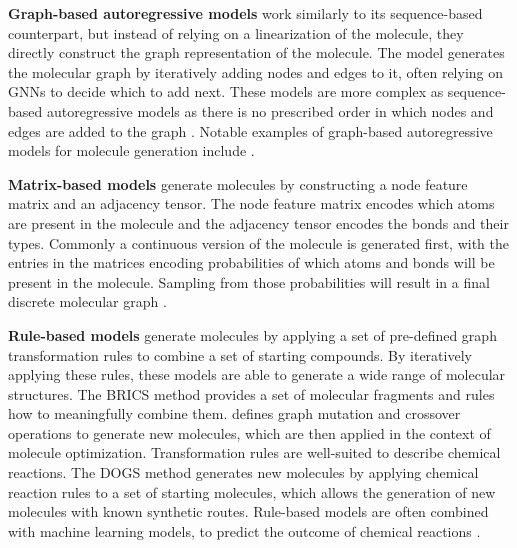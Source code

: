 \textbf{Graph-based autoregressive models} work similarly to its sequence-based counterpart, but
instead of relying on a linearization of the molecule, they directly construct the graph
representation of the molecule. The model generates the molecular graph by iteratively adding nodes
and edges to it, often relying on \acp{GNN} to decide which to add next. These models are more
complex as sequence-based autoregressive models as there is no prescribed order in which nodes and
edges are added to the graph \citep{hanFittingAutoregressiveGraph2023}. Notable examples of
graph-based autoregressive models for molecule generation include
\citep{liuConstrainedGraphVariational2018,liLearningDeepGenerative2018,youGraphConvolutionalPolicy2019,cohen-karlikOvercomingOrderAutoregressive2024}.

\textbf{Matrix-based models}  generate molecules by constructing a node feature matrix and an
adjacency tensor. The node feature matrix encodes which atoms are present in the molecule and the
adjacency tensor encodes the bonds and their types. Commonly a continuous version of the molecule is
generated first, with the entries in the matrices encoding probabilities of which atoms and bonds
will be present in the molecule. Sampling from those probabilities will result in a final discrete
molecular graph
\citep{simonovskyGraphVAEGenerationSmall2018,decaoMolGANImplicitGenerative2018,madhawaGraphNVPInvertibleFlow2019}.

\textbf{Rule-based models} generate molecules by applying a set of pre-defined graph transformation
rules to combine a set of starting compounds. By iteratively applying these rules, these models are
able to generate a wide range of molecular structures. The BRICS \citep{degenArtCompilingUsing2008}
method provides a set of molecular fragments and rules how to meaningfully combine them.
\citet{jensenGraphbasedGeneticAlgorithm2019} defines graph mutation and crossover operations to
generate new molecules, which are then applied in the context of molecule optimization.
Transformation rules are well-suited to describe chemical reactions. The DOGS method
\citep{hartenfellerDOGSReactionDrivenNovo2012} generates new molecules by applying chemical reaction
rules to a set of starting molecules, which allows the generation of new molecules with known
synthetic routes. Rule-based models are often combined with machine learning models, to predict the
outcome of chemical reactions
\citep{seglerNeuralSymbolicMachineLearning2017,seglerPlanningChemicalSyntheses2018,fortunatoDataAugmentationPretraining2020,daiRetrosynthesisPredictionConditional2020}.


